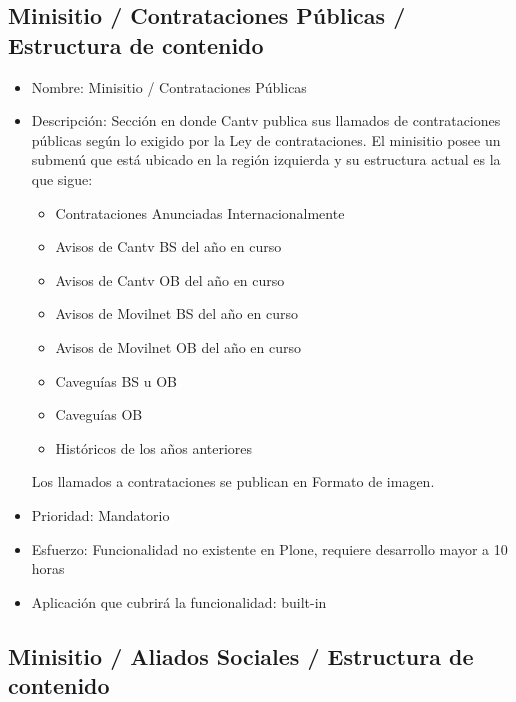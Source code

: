 \documentclass[11pt, letterpaper, oneside, spanish]{scrbook}
\begin{document}
\subsection{Minisitio / Contrataciones Públicas / Estructura de contenido}
\label{sec-2-1-33}

\begin{itemize}
\item Nombre: Minisitio / Contrataciones Públicas
\item Descripción: Sección en donde Cantv publica sus llamados de contrataciones
  públicas según lo exigido por la Ley de contrataciones. El minisitio posee
  un submenú que está ubicado en la región izquierda y su estructura actual es
  la que sigue:
\begin{itemize}
\item Contrataciones Anunciadas Internacionalmente
\item Avisos de Cantv BS del año en curso
\item Avisos de Cantv OB del año en curso
\item Avisos de Movilnet BS del año en curso
\item Avisos de Movilnet OB del año en curso
\item Caveguías BS u OB
\item Caveguías OB
\item Históricos de los años anteriores
\end{itemize}
Los llamados a contrataciones se publican en Formato de imagen.
\item Prioridad: Mandatorio
\item Esfuerzo: Funcionalidad no existente en Plone, requiere desarrollo mayor a
  10 horas
\item Aplicación que cubrirá la funcionalidad:  built-in
\end{itemize}
\subsection{Minisitio / Aliados Sociales / Estructura de contenido}
\label{sec-2-1-34}
\end{document}
